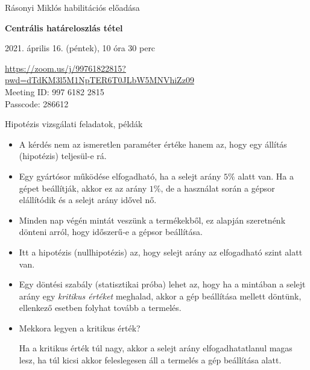 \documentclass[aspectratio=169,notheorems,9pt,\option]{beamer}
\begin{document}
\maketitle

\begin{frame}{Rásonyi Miklós habilitációs előadása}
\vfill
  \begin{center}
    \textbf{Centrális határeloszlás tétel}
    
    \vspace{1cm}

    2021. április 16. (péntek), 10 óra 30 perc
\end{center}
\vfill

\url{https://zoom.us/j/99761822815?pwd=dTdKM3l5M1NpTER6T0JLbW5MNVhiZz09}{}\\
Meeting ID: 997 6182 2815\\
Passcode: 286612
\end{frame} 

\begin{frame}{Hipotézis vizsgálati feladatok, példák}
  \begin{itemize}
    \item A kérdés nem az ismeretlen paraméter értéke hanem az, hogy egy állítás (hipotézis) teljesül-e rá.
    \item Egy gyártósor működése elfogadható, ha a selejt arány $5\%$ alatt van. Ha a gépet beállítják, 
    akkor ez az arány $1\%$, de a használat során a gépsor elállítódik és a selejt arány idővel nő.
    \item Minden nap végén mintát veszünk a termékekből, ez alapján szeretnénk dönteni arról, 
    hogy időszerű-e a gépsor beállítása. 
    \item Itt a hipotézis (nullhipotézis) az, hogy selejt arány az elfogadható szint alatt van.
    \item Egy döntési szabály (statisztikai próba) lehet az, hogy ha a mintában a selejt arány egy \textit{kritikus értéket} 
    meghalad, akkor a gép beállítása mellett döntünk, ellenkező esetben folyhat tovább a termelés.
    \item Mekkora legyen a kritikus érték?
    
    Ha a kritikus érték túl nagy, akkor a selejt arány elfogadhatatlanul magas lesz, ha túl kicsi akkor 
    feleslegesen áll a termelés a gép beállítása alatt.
  \end{itemize}  
\end{frame}
\end{document}
